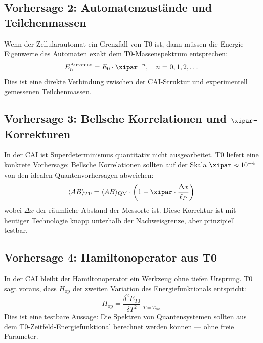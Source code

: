\subsection{Vorhersage 2: Automatenzustände und Teilchenmassen}

Wenn der Zellularautomat ein Grenzfall von T0 ist, dann müssen die
Energie-Eigenwerte des Automaten exakt dem T0-Massenspektrum entsprechen:
\begin{equation}
    E_n^{\text{Automat}} = E_0 \cdot \xipar^{-n}, \quad n = 0, 1, 2, \ldots
    \label{eq:automaton_mass}
\end{equation}
Dies ist eine direkte Verbindung zwischen der CAI-Struktur und experimentell
gemessenen Teilchenmassen.

\subsection{Vorhersage 3: Bellsche Korrelationen und $\xipar$-Korrekturen}

In der CAI ist Superdeterminismus quantitativ nicht ausgearbeitet. T0 liefert
eine konkrete Vorhersage: Bellsche Korrelationen sollten auf der Skala
$\xipar \approx 10^{-4}$ von den idealen Quantenvorhersagen abweichen:
\begin{equation}
    \langle AB \rangle_{T0} = \langle AB \rangle_{\text{QM}}
    \cdot \left(1 - \xipar \cdot \frac{\Delta x}{\ell_P}\right)
    \label{eq:bell_correction}
\end{equation}
wobei $\Delta x$ der räumliche Abstand der Messorte ist. Diese Korrektur ist
mit heutiger Technologie knapp unterhalb der Nachweisgrenze, aber prinzipiell
testbar.

\subsection{Vorhersage 4: Hamiltonoperator aus T0}

In der CAI bleibt der Hamiltonoperator ein Werkzeug ohne tiefen Ursprung. T0
sagt voraus, dass $H_{\text{op}}$ der zweiten Variation des Energiefunktionals
entspricht:
\begin{equation}
    H_{\text{op}} = \frac{\delta^2 E_{T0}}{\delta T^2}
    \bigg|_{T = T_{\text{vac}}}
    \label{eq:hamilton_from_t0}
\end{equation}
Dies ist eine testbare Aussage: Die Spektren von Quantensystemen sollten aus
dem T0-Zeitfeld-Energiefunktional berechnet werden können — ohne freie Parameter.

\clearpage

